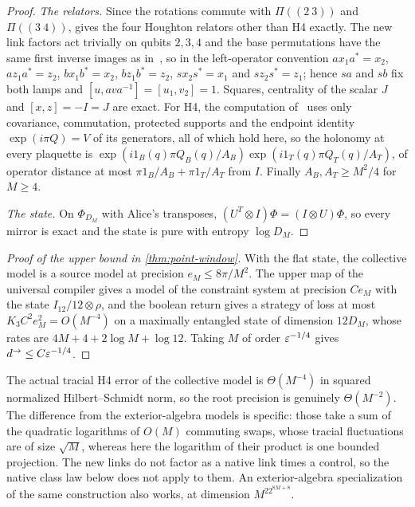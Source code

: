 \begin{proof}
\emph{The relators.} Since the rotations commute with $\Pi((2\ 3))$ and $\Pi((3\ 4))$, \cite[Lemma~6.3]{DM-H3} gives the four
Houghton relators other than H4 exactly. The new link factors act trivially on qubits $2,3,4$ and the base permutations have the
same first inverse images as in~\cite{DM-H3}, so in the left-operator convention $ax_1a^*=x_2$, $az_1a^*=z_2$, $bx_1b^*=x_2$,
$bz_1b^*=z_2$, $sx_2s^*=x_1$ and $sz_2s^*=z_1$; hence $sa$ and $sb$ fix both lamps and $[u,ava^{-1}]=[u_1,v_2]=1$. Squares, centrality
of the scalar $J$ and $[x,z]=-I=J$ are exact. For H4, the computation of~\cite[Lemma~6.4]{DM-H3} uses only covariance,
commutation, protected supports and the endpoint identity $\exp(i\pi Q)=V$ of its generators, all of which hold here, so the
holonomy at every plaquette is $\exp(i1_B(q)\pi Q_B(q)/A_B)\exp(i1_T(q)\pi Q_T(q)/A_T)$, of operator distance at most
$\pi1_B/A_B+\pi1_T/A_T$ from $I$. Finally $A_B,A_T\ge M^2/4$ for $M\ge4$.

\emph{The state.} On $\Phi_{D_M}$ with Alice's transposes, $(U^T\otimes I)\Phi=(I\otimes U)\Phi$, so every mirror is exact and the
state is pure with entropy $\log D_M$.
\end{proof}

\begin{proof}[Proof of the upper bound in \cref{thm:point-window}]
With the flat state, the collective model is a source model at precision $e_M\le8\pi/M^2$. The upper map of the universal compiler
gives a model of the constraint system at precision $Ce_M$ with the state $I_{12}/12\otimes\rho$, and the boolean return gives a
strategy of loss at most $K_3C^2e_M^2=O(M^{-4})$ on a maximally entangled state of dimension $12D_M$, whose rates are
$4M+4+2\log M+\log12$. Taking $M$ of order $\varepsilon^{-1/4}$ gives $d^\to\le C\varepsilon^{-1/4}$.
\end{proof}



\begin{remark}\label{rem:point-collective}
The actual tracial H4 error of the collective model is $\Theta(M^{-4})$ in squared normalized Hilbert--Schmidt norm, so the root
precision is genuinely $\Theta(M^{-2})$. The difference from the exterior-algebra models is specific: those take a sum of the
quadratic logarithms of $O(M)$ commuting swaps, whose tracial fluctuations are of size $\sqrt M$, whereas here the logarithm of
their product is one bounded projection. The new links do not factor as a native link times a control, so the native class law
below does not apply to them. An exterior-algebra specialization of the same construction also works, at dimension
$M^22^{8M+8}$.
\end{remark}


